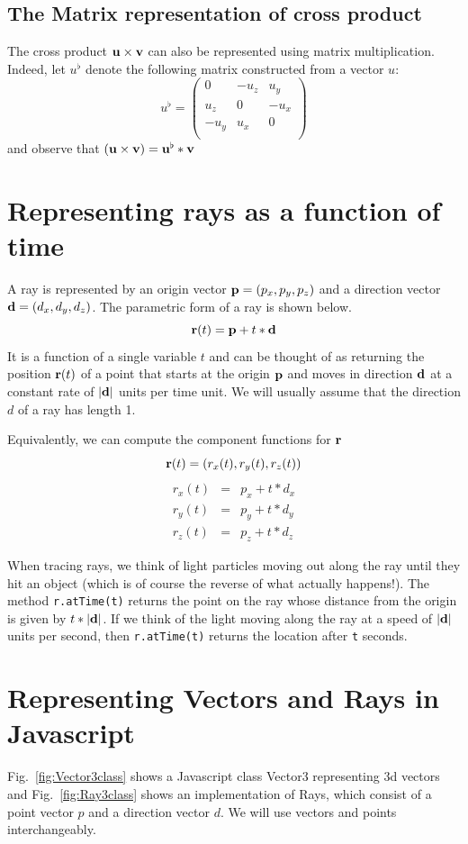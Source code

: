 \documentclass{book}
\newcommand{\vect}[1]{{\bf{ #1}}}
\begin{document}
\subsection{The Matrix representation of cross product}
The cross product  $\vect u \times \vect v$ can also be represented using matrix multiplication.
Indeed, let $u^\flat$ denote the following matrix constructed from a vector $u$:
\[
u^\flat =
\left (
\begin{array}{ccc}
0& -u_z & u_y \\
u_z& 0 & -u_x \\
-u_y & u_x & 0 \\
\end{array}
\right )
\]
and observe that $(\vect u \times \vect v) = \vect u ^ \flat * \vect v$


\section{Representing rays as a function of time}
A ray is represented by an origin vector $\vect p = (p_x, p_y, p_z)$
and a direction vector $\vect d = (d_x,d_y,d_z)$. The parametric form
of a ray is shown below.
\[
{\vect r} (t) = {\vect p} + t*{\vect d}
\]
It is a function of a single variable $t$
and can be thought of as returning the position ${\vect r} (t)$ of a point
that starts at the origin ${\vect p}$ and moves in direction ${\vect d}$
at a constant rate of $\vert \vect d \vert $ units per time unit.
We will usually assume that the direction $d$ of a ray has length 1.

Equivalently, we can compute the component functions for ${\vect r}$
\[
{\vect r} (t) = (r_x(t), r_y(t), r_z(t))
\]
\begin{eqnarray*}
r_x(t) &=& p_x + t*d_x  \\
r_y(t) &=& p_y + t*d_y  \\
r_z(t) &=& p_z + t*d_z
\end{eqnarray*}


When tracing rays, we think of light particles moving out along the ray until they hit an
object (which is of course the reverse of what actually happens!). The method {\tt r.atTime(t)}
returns the point on the ray whose distance from the origin is given by ${ t*\vert \vect d \vert}$. If we
think of the light moving along the ray at a speed of $\vert \vect d \vert$ units per second, then {\tt r.atTime(t)}
returns the location after {\tt t} seconds.



\section{Representing Vectors and Rays in Javascript}
Fig.~\ref{fig:Vector3class} shows a Javascript class Vector3 representing 3d vectors and Fig.~\ref{fig:Ray3class}
shows an implementation of Rays, which consist of a point vector $p$ and a direction vector $d$.
We will use vectors and points interchangeably.
\end{document}
